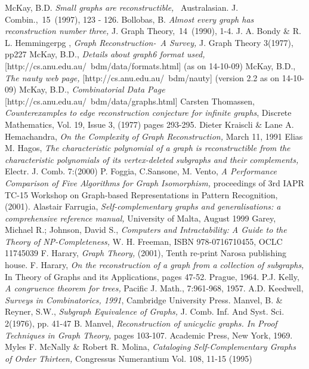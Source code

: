 \documentclass[12pt,conference]{IEEEtran}
\begin{document}
\begin{thebibliography}{}
 McKay, B.D. \emph{Small graphs are reconstructible,}  Australasian. J. Combin., 15 (1997), 123 - 126. 
 Bollobas, B. \emph{Almost every graph has reconstruction number three,} J. Graph Theory, 14 (1990), 1-4. 
J. A. Bondy \& R. L. Hemmingerpg , \emph{Graph Reconstruction- A Survey,} J. Graph Theory 3(1977), pp227 
McKay, B.D., \emph{Details about graph6 format used,} [http://cs.anu.edu.au/~bdm/data/formats.html] (as on 14-10-09) 
McKay, B.D., \emph{The nauty web page,} [http://cs.anu.edu.au/~bdm/nauty] (version 2.2 as on 14-10-09) 
McKay, B.D., \emph{Combinatorial Data Page} [http://cs.anu.edu.au/~bdm/data/graphs.html] 
Carsten Thomassen, \emph{Counterexamples to edge reconstruction conjecture for infinite graphs}, Discrete Mathematics, Vol. 19, Issue 3, (1977) pages 293-295.
Dieter Kraiscli \& Lane A. Hemachandra, \emph{On the Complexity of Graph Reconstruction,} March 11, 1991 
Elias M. Hagos, \emph{The characteristic polynomial of a graph is reconstructible from the characteristic polynomials of its vertex-deleted subgraphs and their complements,} Electr. J. Comb. 7:(2000)
P. Foggia, C.Sansone, M. Vento, \emph{A Performance Comparison of Five Algorithms for Graph Isomorphism,} proceedings of 3rd IAPR TC-15 Workshop on Graph-based Representations in Pattern Recognition, (2001).
Alastair Farrugia, \emph{Self-complementary graphs and generalisations: a comprehensive reference manual,} University of Malta, August 1999
Garey, Michael R.; Johnson, David S., \emph{Computers and Intractability: A Guide to the Theory of NP-Completeness,} W. H. Freeman, ISBN 978-0716710455, OCLC 11745039  
F. Harary, \emph{Graph Theory,} (2001), Tenth re-print Narosa publishing house.
F. Harary, \emph{On the reconstruction of a graph from a collection of subgraphs,} In Theory of Graphs and its Applications, pages 47-52. Prague, 1964. 
P.J. Kelly, \emph{A congruence theorem for trees,} Pacific J. Math., 7:961-968, 1957. 
A.D. Keedwell, \emph{Surveys in Combinatorics, 1991}, Cambridge University Press. 
Manvel, B. \& Reyner, S.W., \emph{Subgraph Equivalence of Graphs,} J. Comb. Inf. And Syst. Sci. 2(1976), pp. 41-47 
B. Manvel, \emph{Reconstruction of unicyclic graphs. In Proof Techniques in Graph Theory,} pages 103-107. Academic Press, New York, 1969. 
Myles F. McNally \& Robert R. Molina, \emph{Cataloging Self-Complementary Graphs of Order Thirteen,} Congressus Numerantium Vol. 108, 11-15 (1995) 

\end{thebibliography}
\end{document}
